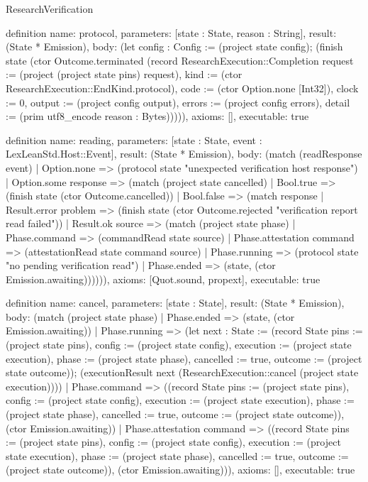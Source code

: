 \begin{lexlean}{ResearchVerification}
\begin{semanticmodule}
definition{
  name: protocol,
  parameters: [state : State, reason : String],
  result: (State * Emission),
  body: (let config : Config := (project state config); (finish state (ctor Outcome.terminated (record ResearchExecution::Completion {request := (project (project state pins) request), kind := (ctor ResearchExecution::EndKind.protocol), code := (ctor Option.none [Int32]), clock := 0, output := (project config output), errors := (project config errors), detail := (prim utf8_encode reason : Bytes)})))),
  axioms: [],
  executable: true
}

definition{
  name: reading,
  parameters: [state : State, event : LexLeanStd.Host::Event],
  result: (State * Emission),
  body: (match (readResponse event)
 | Option.none => (protocol state "unexpected verification host response")
 | Option.some response => (match (project state cancelled) | Bool.true => (finish state (ctor Outcome.cancelled)) | Bool.false => (match response
   | Result.error problem => (finish state (ctor Outcome.rejected "verification report read failed"))
   | Result.ok source => (match (project state phase)
     | Phase.command => (commandRead state source)
     | Phase.attestation command => (attestationRead state command source)
     | Phase.running => (protocol state "no pending verification read")
     | Phase.ended => (state, (ctor Emission.awaiting)))))),
  axioms: [Quot.sound, propext],
  executable: true
}

definition{
  name: cancel,
  parameters: [state : State],
  result: (State * Emission),
  body: (match (project state phase)
 | Phase.ended => (state, (ctor Emission.awaiting))
 | Phase.running => (let next : State := (record State {pins := (project state pins), config := (project state config), execution := (project state execution), phase := (project state phase), cancelled := true, outcome := (project state outcome)}); (executionResult next (ResearchExecution::cancel (project state execution))))
 | Phase.command => ((record State {pins := (project state pins), config := (project state config), execution := (project state execution), phase := (project state phase), cancelled := true, outcome := (project state outcome)}), (ctor Emission.awaiting))
 | Phase.attestation command => ((record State {pins := (project state pins), config := (project state config), execution := (project state execution), phase := (project state phase), cancelled := true, outcome := (project state outcome)}), (ctor Emission.awaiting))),
  axioms: [],
  executable: true
}


\end{semanticmodule}
\end{lexlean}
